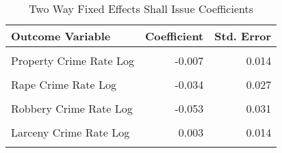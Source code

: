 \begin{table}[H]

\caption{\label{tab:tab:twfe}Two Way Fixed Effects Shall Issue Coefficients}
\centering
\begin{tabular}[t]{lrr}
\toprule
Outcome Variable & Coefficient & Std. Error\\
\midrule
\cellcolor{gray!6}{Violent Crime Rate Log} & \cellcolor{gray!6}{-0.098} & \cellcolor{gray!6}{0.021}\\
Property Crime Rate Log & -0.007 & 0.014\\
\cellcolor{gray!6}{Murder Crime Rate Log} & \cellcolor{gray!6}{-0.051} & \cellcolor{gray!6}{0.039}\\
Rape Crime Rate Log & -0.034 & 0.027\\
\cellcolor{gray!6}{Assault Crime Rate Log} & \cellcolor{gray!6}{-0.100} & \cellcolor{gray!6}{0.027}\\
\addlinespace
Robbery Crime Rate Log & -0.053 & 0.031\\
\cellcolor{gray!6}{Burglary Crime Rate Log} & \cellcolor{gray!6}{-0.046} & \cellcolor{gray!6}{0.019}\\
Larceny Crime Rate Log & 0.003 & 0.014\\
\cellcolor{gray!6}{Autotheft Crime Rate Log} & \cellcolor{gray!6}{-0.009} & \cellcolor{gray!6}{0.028}\\
\bottomrule
\end{tabular}
\end{table}

